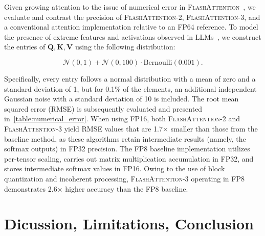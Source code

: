 \begin{algorithm}[H]
\begin{algorithmic}[1]
\begin{enumerate}
Given growing attention to the issue of numerical error in \textsc{FlashAttention}~\citep{golden2024flash}, we evaluate and contrast the precision of \textsc{FlashAttention-2}, \textsc{FlashAttention-3}, and a conventional attention implementation relative to an FP64 reference. To model the presence of extreme features and activations observed in LLMs~\citep{dettmers2208llm, sun2024massive}, we construct the entries of $\mathbf{Q}, \mathbf{K}, \mathbf{V}$ using the following distribution:

\begin{equation*}
  \mathcal{N}(0, 1) + \mathcal{N}(0, 100) \cdot \mathrm{Bernoulli}(0.001).
\end{equation*}

Specifically, every entry follows a normal distribution with a mean of zero and a standard deviation of 1, but for 0.1\% of the elements, an additional independent Gaussian noise with a standard deviation of 10 is included. The root mean squared error (RMSE) is subsequently evaluated and presented in~\cref{table:numerical_error}. When using FP16, both \textsc{FlashAttention-2} and \textsc{FlashAttention-3} yield RMSE values that are 1.7$\times$ smaller than those from the baseline method, as these algorithms retain intermediate results (namely, the softmax outputs) in FP32 precision. The FP8 baseline implementation utilizes per-tensor scaling, carries out matrix multiplication accumulation in FP32, and stores intermediate softmax values in FP16. Owing to the use of block quantization and incoherent processing, \textsc{FlashAttention-3} operating in FP8 demonstrates 2.6$\times$ higher accuracy than the FP8 baseline.

\section{Dicussion, Limitations, Conclusion}
\label{sec:discussion}


\end{enumerate}
\end{algorithmic}
\end{algorithm}
